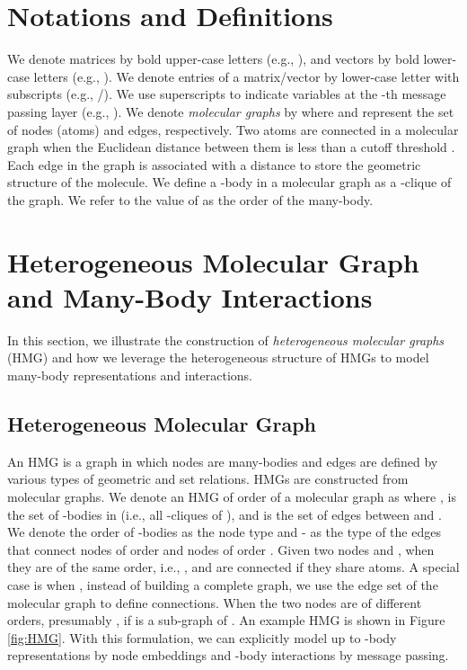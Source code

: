 \documentclass[conference]{IEEEtran}
\begin{document}
\section{Notations and Definitions}
We denote matrices by bold upper-case letters (e.g., ), and vectors by bold lower-case letters (e.g., ). We denote entries of a matrix/vector by lower-case letter with subscripts (e.g., /). We use superscripts to indicate variables at the -th message passing layer (e.g., ). We denote \emph{molecular graphs} by  where  and  represent the set of nodes (atoms) and edges, respectively. Two atoms are connected in a molecular graph when the Euclidean distance between them is less than a cutoff threshold . Each edge in the graph is associated with a distance to store the geometric structure of the molecule. We define a -body in a molecular graph  as a -clique of the graph. We refer to the value of  as the order of the many-body.





\section{Heterogeneous Molecular Graph and Many-Body Interactions}

In this section, we illustrate the construction of \emph{heterogeneous molecular graphs} (HMG) and how we leverage the heterogeneous structure of HMGs to model many-body representations and interactions. 

\subsection{Heterogeneous Molecular Graph} \label{Sec:HMG}

An HMG is a graph in which nodes are many-bodies and edges are defined by various types of geometric and set relations. HMGs are constructed from molecular graphs. We denote an HMG of order  of a molecular graph  as  where ,  is the set of -bodies in  (i.e., all -cliques of ), and  is the set of edges between  and . We denote the order  of -bodies as the node type and - as the type of the edges that connect nodes of order  and nodes of order . Given two nodes  and , when they are of the same order, i.e., ,  and  are connected if they share  atoms. A special case is when , instead of building a complete graph, we use the edge set  of the molecular graph to define connections. When the two nodes are of different orders, presumably ,  if  is a sub-graph of . An example HMG is shown in Figure \ref{fig:HMG}. With this formulation, we can explicitly model up to -body representations by node embeddings and -body interactions by message passing.  
\end{document}
